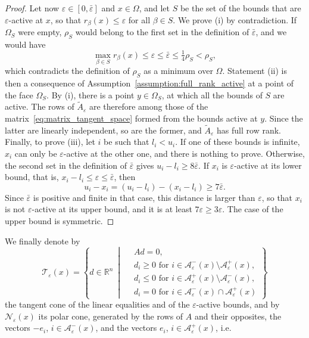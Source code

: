 \documentclass{article}
\numberwithin{equation}{section}
\newcommand{\RR}{{\mathbb{R}}} %
\newcommand{\calA}{{\mathcal{A}}}
\newcommand{\calN}{{\mathcal{N}}}
\newcommand{\calT}{{\mathcal{T}}}
\theoremstyle{plain}
\begin{document}
\begin{proof}
	Let now $\varepsilon \in [0,\bar\varepsilon]$ and $x \in \Omega$, and let $S$ be the set of the bounds that are $\varepsilon$-active at $x$, so that $r_\beta(x) \le \varepsilon$ for all $\beta \in S$. We prove (i) by contradiction. If $\Omega_S$ were empty, $\rho_S$ would belong to the first set in the definition of $\bar\varepsilon$, and we would have
	\[\max_{\beta\in S} r_\beta(x) \le \varepsilon \le \bar\varepsilon \le \tfrac{1}{4}\rho_S < \rho_S,\]
	which contradicts the definition of $\rho_S$ as a minimum over $\Omega$. Statement (ii) is then a consequence of Assumption~\ref{assumption:full_rank_active} at a point of the face $\Omega_S$. By (i), there is a point $y \in \Omega_S$, at which all the bounds of $S$ are active. The rows of $\tilde{A}_\varepsilon$ are therefore among those of the matrix~\eqref{eq:matrix_tangent_space} formed from the bounds active at $y$. Since the latter are linearly independent, so are the former, and $\tilde{A}_\varepsilon$ has full row rank. Finally, to prove (iii), let $i$ be such that $l_i < u_i$. If one of these bounds is infinite, $x_i$ can only be $\varepsilon$-active at the other one, and there is nothing to prove. Otherwise, the second set in the definition of $\bar\varepsilon$ gives $u_i - l_i \ge 8\bar\varepsilon$. If $x_i$ is $\varepsilon$-active at its lower bound, that is, $x_i - l_i \le \varepsilon \le \bar\varepsilon$, then
	\[u_i - x_i = (u_i - l_i) - (x_i - l_i) \ge 7\bar\varepsilon.\]
	Since $\bar\varepsilon$ is positive and finite in that case, this distance is larger than $\varepsilon$, so that $x_i$ is not $\varepsilon$-active at its upper bound, and it is at least $7\varepsilon \ge 3\varepsilon$. The case of the upper bound is symmetric.
\end{proof}
We finally denote by
\begin{equation}\label{eq:tangent_cone_eps}
	\calT_\varepsilon(x) = \left\{ d \in \RR^n \ \middle| \ \begin{aligned} & Ad = 0, \\ & d_i \ge 0 \text{ for } i \in \calA^-_\varepsilon(x)\setminus\calA^+_\varepsilon(x), \\ & d_i \le 0 \text{ for } i \in \calA^+_\varepsilon(x)\setminus\calA^-_\varepsilon(x), \\ 
	& d_i = 0 \text{ for } i \in \calA^-_\varepsilon(x)\cap\calA^+_\varepsilon(x) \end{aligned} \right\}
\end{equation}
the tangent cone of the linear equalities and of the $\varepsilon$-active bounds, and by $\calN_\varepsilon(x)$ its polar cone, generated by the rows of $A$ and their opposites, the vectors $-e_i$, $i \in \calA^-_\varepsilon(x)$, and the vectors $e_i$, $i \in \calA^+_\varepsilon(x)$, i.e.
\end{document}
